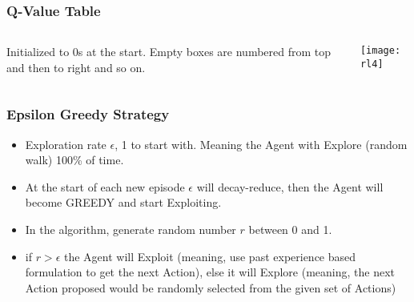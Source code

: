 \begin{frame}[fragile]\frametitle{Q-Value Table}

\begin{columns}
\begin{column}{0.5\textwidth}
Initialized to 0s at the start. Empty boxes are numbered from top and then to right and so on.

\end{column}
\begin{column}{0.5\textwidth}  %
\begin{center}
\texttt{[image: rl4]}
\end{center}
\end{column}
\end{columns}
\end{frame}

\begin{frame}[fragile]\frametitle{Epsilon Greedy Strategy}


\begin{itemize}
\item Exploration rate $\epsilon$, 1 to start with. Meaning the Agent with Explore (random walk) 100\% of time.
\item At the start of each new episode $\epsilon$ will decay-reduce, then the Agent will become GREEDY and start Exploiting.
\item In the algorithm, generate random number $r$ between 0 and 1.
\item if $r > \epsilon$ the Agent will Exploit (meaning, use past experience based formulation to get the next Action), else it will Explore (meaning, the next Action proposed would be randomly selected from the given set of Actions)
\end{itemize}

\end{frame}


